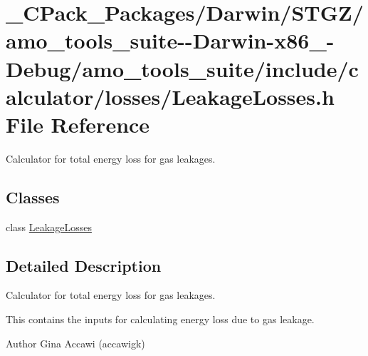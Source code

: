 \hypertarget{___c_pack___packages_2_darwin_2_s_t_g_z_2amo__tools__suite--_darwin-x86__64-_debug_2amo__tools__be1c2deea7260b8efc944b7eabd016c5}{}\section{\+\_\+\+C\+Pack\+\_\+\+Packages/\+Darwin/\+S\+T\+G\+Z/amo\+\_\+tools\+\_\+suite-\/-\/\+Darwin-\/x86\+\_-\/\+Debug/amo\+\_\+tools\+\_\+suite/include/calculator/losses/\+Leakage\+Losses.h File Reference}
\label{___c_pack___packages_2_darwin_2_s_t_g_z_2amo__tools__suite--_darwin-x86__64-_debug_2amo__tools__be1c2deea7260b8efc944b7eabd016c5}


Calculator for total energy loss for gas leakages.  


\subsection*{Classes}
\begin{DoxyCompactItemize}
\item 
class \hyperlink{class_leakage_losses}{Leakage\+Losses}
\end{DoxyCompactItemize}


\subsection{Detailed Description}
Calculator for total energy loss for gas leakages. 

This contains the inputs for calculating energy loss due to gas leakage.

\begin{DoxyAuthor}{Author}
Gina Accawi (accawigk) 
\end{DoxyAuthor}
